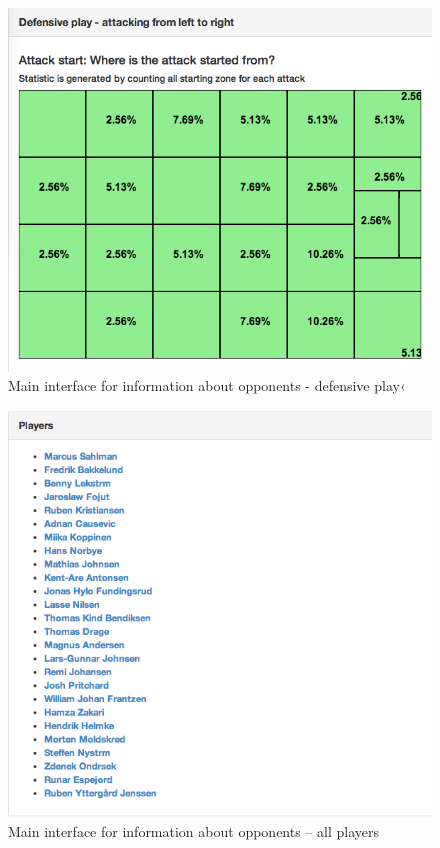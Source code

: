 \begin{figure}[ht!]
\centering
\includegraphics[width=1\textwidth]{images/general/team_analysis3.png}
\caption{Main interface for information about opponents - defensive play‹}
\label{fig:team_analysis2}
\end{figure}

\begin{figure}[ht!]
\centering
\includegraphics[width=1\textwidth]{images/general/team_analysis4.png}
\caption{Main interface for information about opponents – all players}
\label{fig:team_analysis4}
\end{figure}

